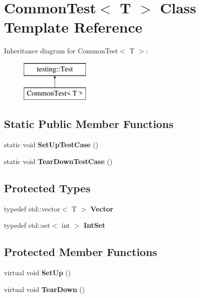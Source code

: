 \hypertarget{class_common_test}{}\section{Common\+Test$<$ T $>$ Class Template Reference}
\label{class_common_test}
Inheritance diagram for Common\+Test$<$ T $>$\+:\begin{figure}[H]
\begin{center}
\leavevmode
\includegraphics[height=2.000000cm]{class_common_test}
\end{center}
\end{figure}
\subsection*{Static Public Member Functions}
\begin{DoxyCompactItemize}
\item 
\mbox{\label{class_common_test_a6edd90f32f45cc49e4a423b22bd770ce}} 
static void {\bfseries Set\+Up\+Test\+Case} ()
\item 
\mbox{\label{class_common_test_a68d2bf5108cf28478331588fbdff4838}} 
static void {\bfseries Tear\+Down\+Test\+Case} ()
\end{DoxyCompactItemize}
\subsection*{Protected Types}
\begin{DoxyCompactItemize}
\item 
\mbox{\label{class_common_test_a6dfdcede6964887b9f4254a0e0478e37}} 
typedef std\+::vector$<$ T $>$ {\bfseries Vector}
\item 
\mbox{\label{class_common_test_a62827e9d3064cddf4a8698747f1bd434}} 
typedef std\+::set$<$ int $>$ {\bfseries Int\+Set}
\end{DoxyCompactItemize}
\subsection*{Protected Member Functions}
\begin{DoxyCompactItemize}
\item 
\mbox{\label{class_common_test_a4c7bf7889ce48a9d06530bc4a437f3f5}} 
virtual void {\bfseries Set\+Up} ()
\item 
\mbox{\label{class_common_test_aeae195c2cefa956c6ae5be1226e6ecd8}} 
virtual void {\bfseries Tear\+Down} ()
\end{DoxyCompactItemize}
